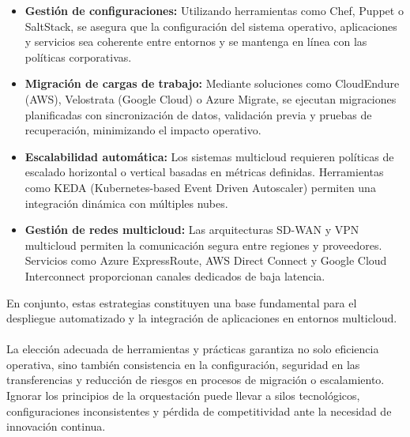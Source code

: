 {\begin{itemize}
                \item \textbf{Gestión de configuraciones:} Utilizando herramientas como Chef, Puppet o SaltStack, se asegura que la configuración del sistema operativo, aplicaciones y servicios sea coherente entre entornos y se mantenga en línea con las políticas corporativas.
                
                \item \textbf{Migración de cargas de trabajo:} Mediante soluciones como CloudEndure (AWS), Velostrata (Google Cloud) o Azure Migrate, se ejecutan migraciones planificadas con sincronización de datos, validación previa y pruebas de recuperación, minimizando el impacto operativo.
                
                \item \textbf{Escalabilidad automática:} Los sistemas multicloud requieren políticas de escalado horizontal o vertical basadas en métricas definidas. Herramientas como KEDA (Kubernetes-based Event Driven Autoscaler) permiten una integración dinámica con múltiples nubes.
                
                \item \textbf{Gestión de redes multicloud:} Las arquitecturas SD-WAN y VPN multicloud permiten la comunicación segura entre regiones y proveedores. Servicios como Azure ExpressRoute, AWS Direct Connect y Google Cloud Interconnect proporcionan canales dedicados de baja latencia.
            \end{itemize}
            
            En conjunto, estas estrategias constituyen una base fundamental para el despliegue automatizado y la integración de aplicaciones en entornos multicloud.
            
            \paragraph{}La elección adecuada de herramientas y prácticas garantiza no solo eficiencia operativa, sino también consistencia en la configuración, seguridad en las transferencias y reducción de riesgos en procesos de migración o escalamiento. Ignorar los principios de la orquestación puede llevar a silos tecnológicos, configuraciones inconsistentes y pérdida de competitividad ante la necesidad de innovación continua.

}
